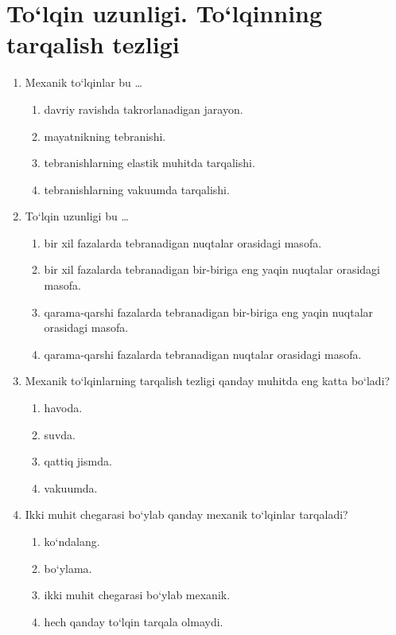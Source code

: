 \section{To‘lqin uzunligi. To‘lqinning tarqalish tezligi}




\begin{enumerate}

\item Mexanik to‘lqinlar bu …
\begin{enumerate}[label=\Alph*)]
\item davriy ravishda takrorlanadigan jarayon.
\item mayatnikning tebranishi.
\item tebranishlarning elastik muhitda tarqalishi.
\item tebranishlarning vakuumda tarqalishi.

\end{enumerate}

\item To‘lqin uzunligi bu …
\begin{enumerate}[label=\Alph*)]
\item bir xil fazalarda tebranadigan nuqtalar orasidagi masofa.
\item bir xil fazalarda tebranadigan bir-biriga eng yaqin nuqtalar orasidagi masofa.
\item qarama-qarshi fazalarda tebranadigan bir-biriga eng yaqin nuqtalar orasidagi masofa.
\item qarama-qarshi fazalarda tebranadigan nuqtalar orasidagi masofa.
\end{enumerate}

\item Mexanik to‘lqinlarning tarqalish tezligi qanday muhitda eng katta bo‘ladi?
\begin{enumerate}[label=\Alph*)]
\item havoda.
\item suvda.
\item qattiq jismda.
\item vakuumda.

\end{enumerate}

\item Ikki muhit chegarasi bo‘ylab qanday mexanik to‘lqinlar tarqaladi?
\begin{enumerate}[label=\Alph*)]
\item ko‘ndalang.
\item bo‘ylama.
\item ikki muhit chegarasi bo‘ylab mexanik.
\item hech qanday to‘lqin tarqala olmaydi.


\end{enumerate}
\end{enumerate}

